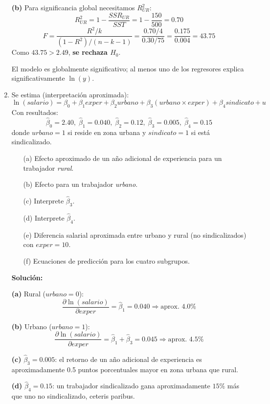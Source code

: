 \documentclass[11pt,a4paper]{article}
\begin{document}
\begin{enumerate}
\textbf{(b)} Para significancia global necesitamos $R^2_{UR}$:
\[
R^2_{UR} = 1 - \frac{SSR_{UR}}{SST} = 1 - \frac{150}{500} = 0.70
\]
\[
F = \frac{R^2/k}{(1-R^2)/(n-k-1)} = \frac{0.70/4}{0.30/75} = \frac{0.175}{0.004} = 43.75
\]
Como $43.75 > 2.49$, \textbf{se rechaza $H_0$}.

\begin{conclusion}
El modelo es globalmente significativo; al menos uno de los regresores explica significativamente $\ln(y)$.
\end{conclusion}

\item Se estima (interpretación aproximada):
\[
\ln(salario) = \beta_0 + \beta_1 exper + \beta_2 urbano + \beta_3 (urbano \times exper) + \beta_4 sindicato + u
\]
Con resultados:
\[
\hat{\beta}_0 = 2.40, \; \hat{\beta}_1 = 0.040, \; \hat{\beta}_2 = 0.12, \; \hat{\beta}_3 = 0.005, \; \hat{\beta}_4 = 0.15
\]
donde $urbano=1$ si reside en zona urbana y $sindicato=1$ si está sindicalizado.
\begin{enumerate}
    \item[(a)] Efecto aproximado de un año adicional de experiencia para un trabajador \emph{rural}.
    \item[(b)] Efecto para un trabajador \emph{urbano}.
    \item[(c)] Interprete $\hat{\beta}_3$.
    \item[(d)] Interprete $\hat{\beta}_4$.
    \item[(e)] Diferencia salarial aproximada entre urbano y rural (no sindicalizados) con $exper=10$.
    \item[(f)] Ecuaciones de predicción para los cuatro subgrupos.
\end{enumerate}
\textbf{Solución:}

\textbf{(a)} Rural ($urbano=0$):
\[
\frac{\partial \ln(salario)}{\partial exper} = \hat{\beta}_1 = 0.040 \Rightarrow \text{aprox. } 4.0\%
\]

\textbf{(b)} Urbano ($urbano=1$):
\[
\frac{\partial \ln(salario)}{\partial exper} = \hat{\beta}_1 + \hat{\beta}_3 = 0.045 \Rightarrow \text{aprox. } 4.5\%
\]

\textbf{(c)} $\hat{\beta}_3 = 0.005$: el retorno de un año adicional de experiencia es aproximadamente 0.5 puntos porcentuales mayor en zona urbana que rural.

\textbf{(d)} $\hat{\beta}_4 = 0.15$: un trabajador sindicalizado gana aproximadamente $15\%$ más que uno no sindicalizado, ceteris paribus.


\end{enumerate}
\end{document}
